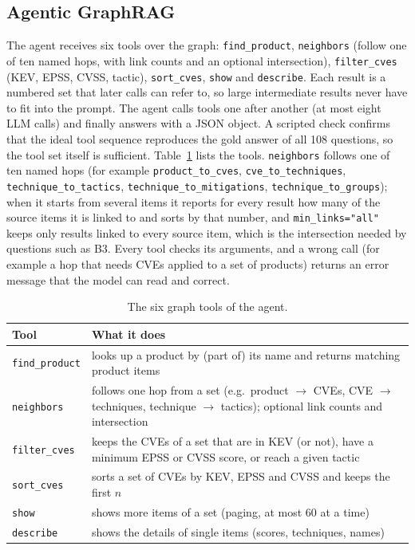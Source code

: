 \documentclass[12pt, a4paper]{article}
\begin{document}
\subsection{Agentic GraphRAG}
The agent receives six tools over the graph: \texttt{find\_product}, \texttt{neighbors} (follow one of ten named hops, with link counts and an optional intersection), \texttt{filter\_cves} (KEV, EPSS, CVSS, tactic), \texttt{sort\_cves}, \texttt{show} and \texttt{describe}. Each result is a numbered set that later calls can refer to, so large intermediate results never have to fit into the prompt. The agent calls tools one after another (at most eight LLM calls) and finally answers with a JSON object. A scripted check confirms that the ideal tool sequence reproduces the gold answer of all 108 questions, so the tool set itself is sufficient.
Table~\ref{tab:tools} lists the tools. \texttt{neighbors} follows one of ten named hops (for example \texttt{product\_to\_cves}, \texttt{cve\_to\_techniques}, \texttt{technique\_to\_tactics}, \texttt{technique\_to\_mitigations}, \texttt{technique\_to\_groups}); when it starts from several items it reports for every result how many of the source items it is linked to and sorts by that number, and \texttt{min\_links="all"} keeps only results linked to every source item, which is the intersection needed by questions such as B3. Every tool checks its arguments, and a wrong call (for example a hop that needs CVEs applied to a set of products) returns an error message that the model can read and correct.
\begin{table}[H]\centering\caption{The six graph tools of the agent.}\label{tab:tools}
\begin{tabularx}{\textwidth}{>{\raggedright\arraybackslash}p{3.1cm}>{\raggedright\arraybackslash}X}\toprule
\textbf{Tool} & \textbf{What it does} \\ \midrule
\texttt{find\_product} & looks up a product by (part of) its name and returns matching product items \\
\texttt{neighbors} & follows one hop from a set (e.g.\ product $\rightarrow$ CVEs, CVE $\rightarrow$ techniques, technique $\rightarrow$ tactics); optional link counts and intersection \\
\texttt{filter\_cves} & keeps the CVEs of a set that are in KEV (or not), have a minimum EPSS or CVSS score, or reach a given tactic \\
\texttt{sort\_cves} & sorts a set of CVEs by KEV, EPSS and CVSS and keeps the first $n$ \\
\texttt{show} & shows more items of a set (paging, at most 60 at a time) \\
\texttt{describe} & shows the details of single items (scores, techniques, names) \\ \bottomrule
\end{tabularx}
\end{table}
\end{document}
